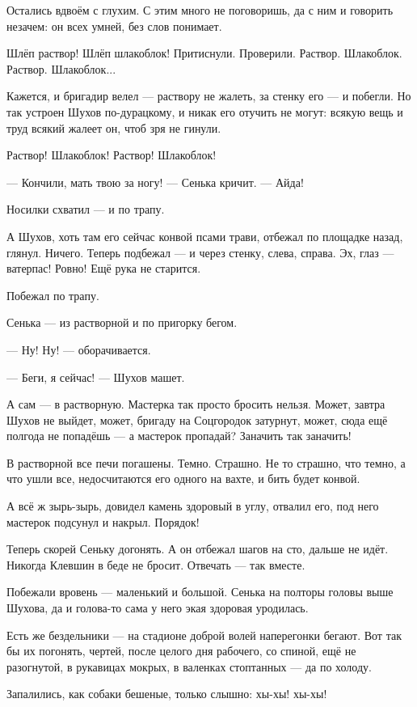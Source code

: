 Остались вдвоём с глухим. С этим много не поговоришь, да с ним и говорить незачем: он всех
умней, без слов понимает.

Шлёп раствор! Шлёп шлакоблок! Притиснули. Проверили. Раствор. Шлакоблок. Раствор. Шлакоблок...

Кажется, и бригадир велел --- раствору не жалеть, за стенку его --- и побегли. Но так устроен
Шухов по-дурацкому, и никак его отучить не могут: всякую вещь и труд всякий жалеет он, чтоб
зря не гинули.

Раствор! Шлакоблок! Раствор! Шлакоблок!

--- Кончили, мать твою за ногу! --- Сенька кричит. --- Айда!

Носилки схватил --- и по трапу.

А Шухов, хоть там его сейчас конвой псами трави, отбежал по площадке назад, глянул. Ничего.
Теперь подбежал --- и через стенку, слева, справа. Эх, глаз --- ватерпас! Ровно! Ещё рука не
старится.

Побежал по трапу.

Сенька --- из растворной и по пригорку бегом.

--- Ну! Ну! --- оборачивается.

--- Беги, я сейчас! --- Шухов машет.

А сам --- в растворную. Мастерка так просто бросить нельзя. Может, завтра Шухов не выйдет,
может, бригаду на Соцгородок затурнут, может, сюда ещё полгода не попадёшь --- а мастерок
пропадай? Заначить так заначить!

В растворной все печи погашены. Темно. Страшно. Не то страшно, что темно, а что ушли все,
недосчитаются его одного на вахте, и бить будет конвой.

А всё ж зырь-зырь, довидел камень здоровый в углу, отвалил его, под него мастерок подсунул и
накрыл. Порядок!

Теперь скорей Сеньку догонять. А он отбежал шагов на сто, дальше не идёт. Никогда Клевшин в
беде не бросит. Отвечать --- так вместе.

Побежали вровень --- маленький и большой. Сенька на полторы головы выше Шухова, да и голова-то
сама у него экая здоровая уродилась.

Есть же бездельники --- на стадионе доброй волей наперегонки бегают. Вот так бы их погонять,
чертей, после целого дня рабочего, со спиной, ещё не разогнутой, в рукавицах мокрых, в
валенках стоптанных --- да по холоду.

Запалились, как собаки бешеные, только слышно: хы-хы! хы-хы!

